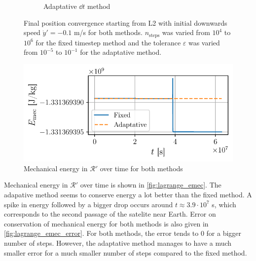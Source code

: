 \begin{figure}[h]
\begin{subfigure}{0.49\linewidth}
        \caption{Adaptative \(\dd t\) method}
        \label{fig:lagrange_conv_adapt}
    \end{subfigure}
    \caption{Final position convergence starting from L2 with initial downwards speed \(\dot y' = -0.1\) m/s for both methods. \(n_\textrm{steps}\) was varied from \(10^4\) to \(10^6\) for the fixed timestep method and the tolerance \(\varepsilon\) was varied from \(10^{-5}\) to \(10^{-1}\) for the adaptative method.}
    \label{fig:lagrange_conv}
\end{figure}


\begin{figure}
    \vspace*{-0.2cm}
    \centering
    \includegraphics[width=\linewidth]{figures/lagrange_emec.pdf}
    \caption{Mechanical energy in \(\mathcal R'\) over time for both methods}
    \label{fig:lagrange_emec}
    \vspace*{-0.5cm}
\end{figure}
Mechanical energy in \(\mathcal R'\) over time is shown in \autoref{fig:lagrange_emec}. The adapative method seems to conserve energy a lot better than the fixed method. A spike in energy followed by a bigger drop occurs around \(t \approx 3.9 \cdot 10^7\) s, which corresponds to the second passage of the satelite near Earth. Error on conservation of mechanical energy for both methods is also given in \autoref{fig:lagrange_emec_error}. For both methods, the error tends to 0 for a bigger number of steps. However, the adaptative method manages to have a much smaller error for a much smaller number of steps compared to the fixed method.

